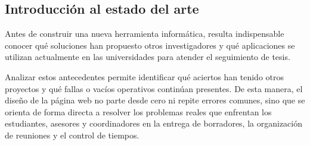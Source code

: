 \subsection{Introducción al estado del arte}
\label{subsec:intro_estado_arte}

Antes de construir una nueva herramienta informática, resulta indispensable conocer qué soluciones han propuesto otros investigadores y qué aplicaciones se utilizan actualmente en las universidades para atender el seguimiento de tesis. 

Analizar estos antecedentes permite identificar qué aciertos han tenido otros proyectos y qué fallas o vacíos operativos continúan presentes. De esta manera, el diseño de la página web no parte desde cero ni repite errores comunes, sino que se orienta de forma directa a resolver los problemas reales que enfrentan los estudiantes, asesores y coordinadores en la entrega de borradores, la organización de reuniones y el control de tiempos.